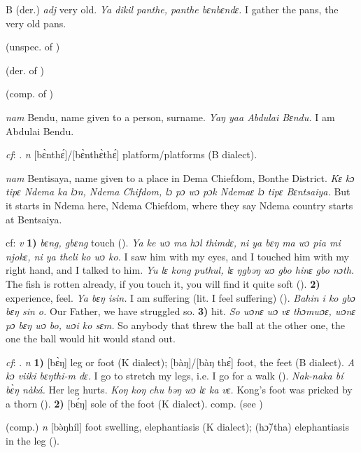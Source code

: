 \begin{letter}{B}
 (der.) \textit{adj} very old. \textit{Ya dikil panthe, panthe bɛnbɛndɛ.} I gather the pans, the very old pans.

 (unspec. of ) 

 (der. of ) 

 (comp. of )

 \textit{nam} Bendu, name given to a person, surname. \textit{Yaŋ yaa Abdulai Bɛndu.} I am Abdulai Bendu.

 \textit{cf}: . \textit{n} [bɛ̀nthɛ́]/[bɛ̀nthɛ̀thɛ́] platform/platforms (B dialect).

 \textit{nam} Bentisaya, name given to a place in Dema Chiefdom, Bonthe District. \textit{Kɛ kɔ tipɛ Ndema ka lɔn, Ndema Chifdom, lɔ pɔ wɔ pɔk Ndemaɛ lɔ tipɛ Bɛntsaiya.} But it starts in Ndema here, Ndema Chiefdom, where they say Ndema country starts at Bentsaiya. 

 cf:  \textit{v} \textbf{1)} \textit{bɛng, gbɛng} touch (\citealt{Pichl1967}). \textit{Ya ke wɔ ma hɔl thimdɛ, ni ya bɛŋ ma wɔ pia mi njokɛ, ni ya theli ko wɔ ko.} I saw him with my eyes, and I touched him with my right hand, and I talked to him. \textit{Yu lɛ kong puthul, lɛ ŋgbəŋ wɔ gbo hinɛ gbo nɔth.} The fish is rotten already, if you touch it, you will find it quite soft (\citealt{Pichl1967}). \textbf{2)} experience, feel. \textit{Ya bɛŋ isin.} I am suffering (lit. I feel suffering) (\citealt{Pichl1967}). \textit{Bahin i ko gbɔ bɛŋ sin o.} Our Father, we have struggled so. \textbf{3)} hit. \textit{So wɔnɛ wɔ vɛ thɔmwɔɛ, wɔnɛ pɔ bɛŋ wɔ bo, wɔi ko sɛm.} So anybody that threw the ball at the other one, the one the ball would hit would stand out.

 \textit{cf}: . \textit{n} \textbf{1)} [bɛ̀ŋ] leg or foot (K dialect); [bàŋ]/[bàŋ thɛ́] foot, the feet (B dialect). \textit{A kɔ viiki bɛŋthi-m dɛ.} I go to stretch my legs, i.e. I go for a walk (\citealt{Pichl1967}). \textit{Nak-naka bí bɛ̀ŋ nàká.} Her leg hurts. \textit{Koŋ koŋ chu bəŋ wɔ lɛ ka vɛ.} Kong's foot was pricked by a thorn (\citealt{Pichl1967}). \textbf{2)} [bɛ́ŋ] sole of the foot (K dialect). comp.  (see )

 (comp.) \textit{n} [bə̀ŋhíl] foot swelling, elephantiasis (K dialect); (hɔ̃/tha) elephantiasis in the leg (\citealt{Pichl1967}). 


\end{letter}
